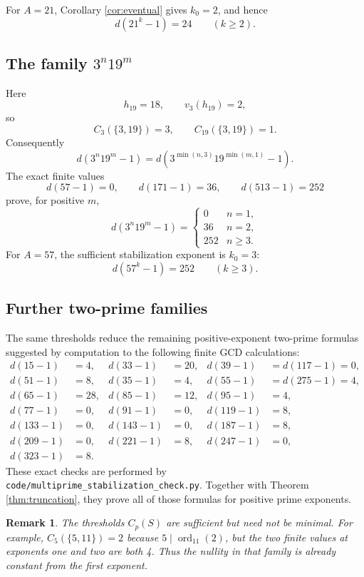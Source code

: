 \documentclass[a4paper]{article}
\newtheorem{remark}[theorem]{Remark}
\newcommand{\ord}[2][]{\operatorname{ord}_{#1}\!\left(#2\right)}
\begin{document}
For $A=21$, Corollary \ref{cor:eventual} gives $k_0=2$, and hence
\[
	d(21^k-1)=24
	\qquad(k\geq2).
\]

\subsection{The family $3^n19^m$}

Here
\[
	h_{19}=18,
	\qquad
	v_3(h_{19})=2,
\]
so
\[
	C_3(\{3,19\})=3,
	\qquad
	C_{19}(\{3,19\})=1.
\]
Consequently
\[
	d(3^n19^m-1)
	=
	d\!\left(3^{\min(n,3)}19^{\min(m,1)}-1\right).
\]
The exact finite values
\[
	d(57-1)=0,\qquad
	d(171-1)=36,\qquad
	d(513-1)=252
\]
prove, for positive $m$,
\[
	d(3^n19^m-1)
	=
	\begin{cases}
		0 & n=1,\\
		36 & n=2,\\
		252 & n\geq3.
	\end{cases}
\]
For $A=57$, the sufficient stabilization exponent is $k_0=3$:
\[
	d(57^k-1)=252
	\qquad(k\geq3).
\]

\subsection{Further two-prime families}

The same thresholds reduce the remaining positive-exponent two-prime formulas suggested by computation to the following finite GCD calculations:
\begin{align*}
	d(15-1)&=4, &
	d(33-1)&=20, &
	d(39-1)&=d(117-1)=0,\\
	d(51-1)&=8, &
	d(35-1)&=4, &
	d(55-1)&=d(275-1)=4,\\
	d(65-1)&=28, &
	d(85-1)&=12, &
	d(95-1)&=4,\\
	d(77-1)&=0, &
	d(91-1)&=0, &
	d(119-1)&=8,\\
	d(133-1)&=0, &
	d(143-1)&=0, &
	d(187-1)&=8,\\
	d(209-1)&=0, &
	d(221-1)&=8, &
	d(247-1)&=0,\\
	d(323-1)&=8.
\end{align*}
These exact checks are performed by \texttt{code/multiprime\_stabilization\_check.py}.
Together with Theorem \ref{thm:truncation}, they prove all of those formulas for positive prime exponents.

\begin{remark}
	The thresholds $C_p(S)$ are sufficient but need not be minimal.
	For example, $C_5(\{5,11\})=2$ because $5\mid\ord[11]{2}$, but the two finite values at exponents one and two are both 4.
	Thus the nullity in that family is already constant from the first exponent.
\end{remark}



\end{document}
